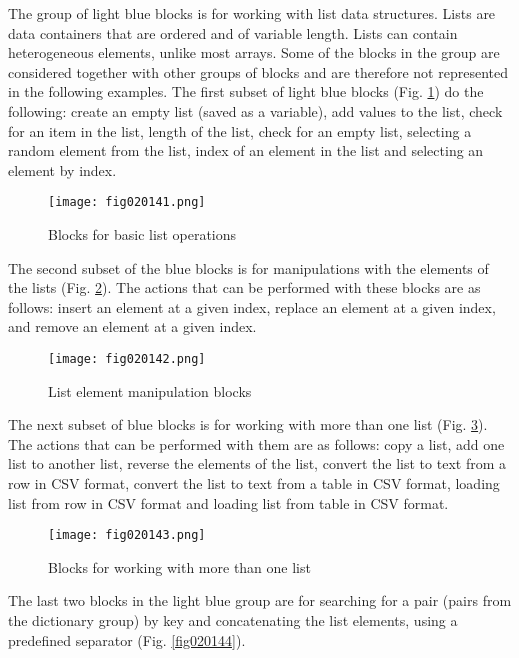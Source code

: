 The group of light blue blocks is for working with list data structures. Lists are data containers that are ordered and of variable length. Lists can contain heterogeneous elements, unlike most arrays. Some of the blocks in the group are considered together with other groups of blocks and are therefore not represented in the following examples. The first subset of light blue blocks (Fig. \ref{fig020141}) do the following: create an empty list (saved as a variable), add values to the list, check for an item in the list, length of the list, check for an empty list, selecting a random element from the list, index of an element in the list and selecting an element by index.

\begin{figure}[H]
   \centering
   \texttt{[image: fig020141.png]}
   \caption{Blocks for basic list operations}
\label{fig020141}
\end{figure}

The second subset of the blue blocks is for manipulations with the elements of the lists (Fig. \ref{fig020142}). The actions that can be performed with these blocks are as follows: insert an element at a given index, replace an element at a given index, and remove an element at a given index.

\begin{figure}[H]
   \centering
   \texttt{[image: fig020142.png]}
   \caption{List element manipulation blocks}
\label{fig020142}
\end{figure}

The next subset of blue blocks is for working with more than one list (Fig. \ref{fig020143}). The actions that can be performed with them are as follows: copy a list, add one list to another list, reverse the elements of the list, convert the list to text from a row in CSV format, convert the list to text from a table in CSV format, loading list from row in CSV format and loading list from table in CSV format.

\begin{figure}[H]
   \centering
   \texttt{[image: fig020143.png]}
   \caption{Blocks for working with more than one list}
\label{fig020143}
\end{figure}

The last two blocks in the light blue group are for searching for a pair (pairs from the dictionary group) by key and concatenating the list elements, using a predefined separator (Fig. \ref{fig020144}).

